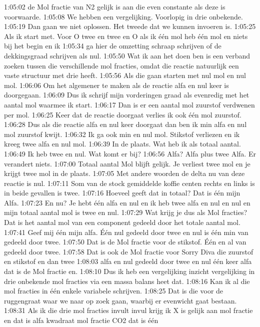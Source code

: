 1:05:02
de Mol fractie van N2 gelijk is aan die even constante als deze is voorwaarde.
1:05:08
We hebben een vergelijking. Voorlopig in drie onbekende.
1:05:19
Dan gaan we niet oplossen. Het tweede dat we kunnen invoeren is.
1:05:25
Als ik start met. Voor O twee en twee en O als ik één mol heb één mol en niets bij het begin en ik
1:05:34
ga hier de omzetting schraap schrijven of de dekkingsgraad schrijven als nul.
1:05:50
Wat ik aan het doen ben is een verband zoeken tussen die verschillende mol fracties, omdat die reactie natuurlijk een vaste structuur met drie heeft.
1:05:56
Als die gaan starten met nul mol en nul mol.
1:06:06
Om het algemener te maken als de reactie alfa en nul keer is doorgegaan.
1:06:09
Dus ik schrijf mijn vorderingen graad als evenredig met het aantal mol waarmee ik start.
1:06:17
Dan is er een aantal mol zuurstof verdwenen per mol.
1:06:25
Keer dat de reactie doorgaat verlies ik ook één mol zuurstof.
1:06:28
Dus als die reactie alfa en nul keer doorgaat dan ben ik min alfa en nul mol zuurstof kwijt.
1:06:32
Ik ga ook min en nul mol. Stikstof verliezen en ik kreeg twee alfa en nul mol.
1:06:39
In de plaats. Wat heb ik als totaal aantal.
1:06:49
Ik heb twee en nul. Wat komt er bij?
1:06:56
Alfa? Alfa plus twee Alfa. Er verandert niets.
1:07:00
Totaal aantal Mol blijft gelijk. Je verliest twee mol en je krijgt twee mol in de plaats.
1:07:05
Met andere woorden de delta nu van deze reactie is nul.
1:07:11
Som van de stock gemiddelde koffie centen rechts en links is in beide gevallen is twee.
1:07:16
Hoeveel geeft dat in totaal? Dat is één mijn Alfa.
1:07:23
En nu? Je hebt één alfa en nul en ik heb twee alfa en nul en nul en mijn totaal aantal mol is twee en nul.
1:07:29
Wat krijg je dus als Mol fracties? Dat is het aantal mol van een component gedeeld door het totale aantal mol.
1:07:41
Geef mij één mijn alfa. Één nul gedeeld door twee en nul is één min van gedeeld door twee.
1:07:50
Dat is de Mol fractie voor de stikstof. Één en al van gedeeld door twee.
1:07:58
Dat is ook de Mol fractie voor Sorry Diva die zuurstof en stikstof en dan twee
1:08:03
alfa en nul gedeeld door twee en nul één keer alfa dat is de Mol fractie en.
1:08:10
Dus ik heb een vergelijking inzicht vergelijking in drie onbekende mol fracties via een massa balans heet dat.
1:08:16
Kan ik al die mol fracties in één enkele variabele schrijven.
1:08:25
Dat is die voor de ruggengraat waar we naar op zoek gaan, waarbij er evenwicht gaat bestaan.
1:08:31
Als ik die drie mol fracties invult invul krijg ik X is gelijk aan mol fractie en dat is alfa kwadraat mol fractie CO2 dat is één
